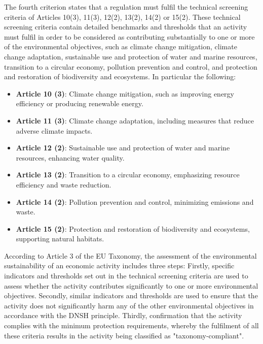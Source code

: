 The fourth criterion states that a regulation must fulfil the technical screening criteria of Articles 10(3), 11(3), 12(2), 13(2), 14(2) or 15(2). These technical screening criteria contain detailed benchmarks and thresholds that an activity must fulfil in order to be considered as contributing substantially to one or more of the environmental objectives, such as climate change mitigation, climate change adaptation, sustainable use and protection of water and marine resources, transition to a circular economy, pollution prevention and control, and protection and restoration of biodiversity and ecosystems. In particular the following\autocites[Cf.][Article 3, 12-15]{eu_regulation}:
\begin{itemize}
    \item \textbf{Article 10 (3)}: Climate change mitigation, such as improving energy efficiency or producing renewable energy.
    \item \textbf{Article 11 (3)}: Climate change adaptation, including measures that reduce adverse climate impacts.
    \item \textbf{Article 12 (2)}: Sustainable use and protection of water and marine resources, enhancing water quality.
    \item \textbf{Article 13 (2)}: Transition to a circular economy, emphasizing resource efficiency and waste reduction.
    \item \textbf{Article 14 (2)}: Pollution prevention and control, minimizing emissions and waste.
    \item \textbf{Article 15 (2)}: Protection and restoration of biodiversity and ecosystems, supporting natural habitats.
\end{itemize}


According to Article 3 of the EU Taxonomy, the assessment of the environmental sustainability of an economic activity includes three steps: Firstly, specific indicators and thresholds set out in the technical screening criteria are used to assess whether the activity contributes significantly to one or more environmental objectives. Secondly, similar indicators and thresholds are used to ensure that the activity does not significantly harm any of the other environmental objectives in accordance with the \ac{DNSH} principle. Thirdly, confirmation that the activity complies with the minimum protection requirements, whereby the fulfilment of all these criteria results in the activity being classified as "taxonomy-compliant". 
\autocites[Cf.]{eu_regulation}[Cf.][10]{tax1}

